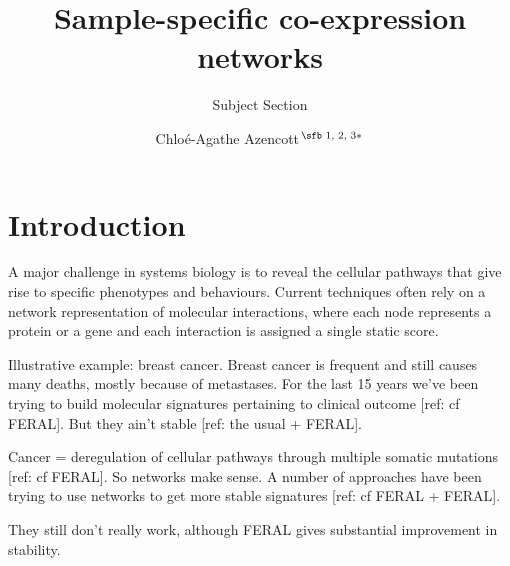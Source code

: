 \documentclass{bioinfo}
\newcommand{\todo}[1]{{\color{teal} #1}}
\begin{document}

\subtitle{Subject Section}

\title[Sample-specific co-expression networks]{Sample-specific co-expression networks}
\author[Azencott]{Chlo\'e-Agathe Azencott\,$^{\text{\sfb 1, 2, 3}*}$}
\address{$^{\text{\sf 1}}$MINES ParisTech, PSL-Research University, CBIO-Centre for Computational Biology, 35 rue St Honor\'e 77300 Fontainebleau, France\\
$^{\text{\sf 2}}$Institut Curie, 75248 Paris Cedex 05, France\\
$^{\text{\sf 3}}$INSERM, U900, 75248 Paris Cedex 05, France}





\maketitle

\section{Introduction}

\todo{A major challenge in systems biology is to reveal the cellular pathways that give rise to specific phenotypes and behaviours. Current techniques often rely on a network representation of molecular interactions, where each node represents a protein or a gene and each interaction is assigned a single static score.}

\todo{Illustrative example: breast cancer. 
Breast cancer is frequent and still causes many deaths, mostly because of metastases. 
For the last 15 years we've been trying to build molecular signatures pertaining to clinical outcome [ref: cf FERAL].
But they ain't stable [ref: the usual + FERAL].

Cancer = deregulation of cellular pathways through multiple somatic mutations [ref: cf FERAL]. So networks make sense. 
A number of approaches have been trying to use networks to get more stable signatures [ref: cf FERAL + FERAL].

They still don't really work, although FERAL gives substantial improvement in stability. }
\end{document}
